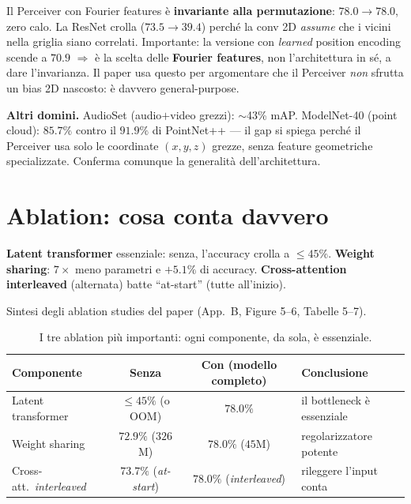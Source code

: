 \documentclass[11pt]{article}
\newcommand{\curstage}{0}
\newcommand{\stage}[1]{\gdef\curstage{#1}}
\begin{document}
\begin{ideabox}[title={\textbf{Idea chiave --- il risultato che ``vende'' il Perceiver}}]
Il Perceiver con Fourier features è \textbf{invariante alla permutazione}: $78.0 \to 78.0$, zero calo. La ResNet crolla ($73.5 \to 39.4$) perché la conv 2D \emph{assume} che i vicini nella griglia siano correlati. Importante: la versione con \emph{learned} position encoding scende a $70.9$ $\Rightarrow$ è la scelta delle \textbf{Fourier features}, non l'architettura in sé, a dare l'invarianza. Il paper usa questo per argomentare che il Perceiver \emph{non} sfrutta un bias 2D nascosto: è davvero general-purpose.
\end{ideabox}

\textbf{Altri domini.} AudioSet (audio$+$video grezzi): $\sim$43\% mAP. ModelNet-40 (point cloud): $85.7\%$ contro il $91.9\%$ di PointNet++ --- il gap si spiega perché il Perceiver usa solo le coordinate $(x,y,z)$ grezze, senza feature geometriche specializzate. Conferma comunque la generalità dell'architettura.

\section{Ablation: cosa conta davvero}
\stage{0}

\begin{brevebox}[title={\textbf{In breve}}]
\textbf{Latent transformer} essenziale: senza, l'accuracy crolla a $\le 45\%$. \textbf{Weight sharing}: $7\times$ meno parametri e $+5.1\%$ di accuracy. \textbf{Cross-attention interleaved} (alternata) batte ``at-start'' (tutte all'inizio).
\end{brevebox}

Sintesi degli ablation studies del paper (App.~B, Figure 5--6, Tabelle 5--7).

\begin{table}[htbp]
\centering
\caption{I tre ablation più importanti: ogni componente, da sola, è essenziale.}
\small
\begin{tabular}{@{}lccl@{}}
\toprule
\textbf{Componente} & \textbf{Senza} & \textbf{Con (modello completo)} & \textbf{Conclusione} \\
\midrule
Latent transformer        & $\le 45\%$ (o OOM) & $78.0\%$ & il bottleneck è essenziale \\
Weight sharing            & $72.9\%$ ($326$M) & $78.0\%$ ($45$M) & regolarizzatore potente \\
Cross-att.\ \emph{interleaved} & $73.7\%$ (\emph{at-start}) & $78.0\%$ (\emph{interleaved}) & rileggere l'input conta \\
\bottomrule
\end{tabular}
\end{table}
\end{document}
